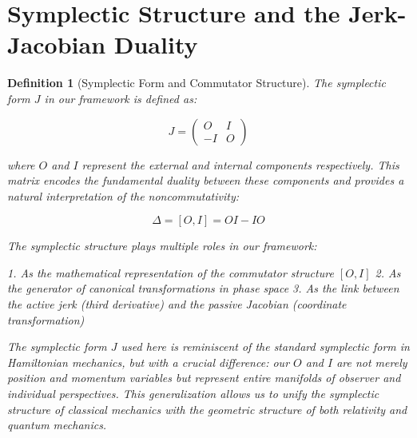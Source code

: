 \documentclass{article}
\newtheorem{definition}{Definition}
\begin{document}
\section{Symplectic Structure and the Jerk-Jacobian Duality}

\begin{definition}[Symplectic Form and Commutator Structure]
The symplectic form $J$ in our framework is defined as:

\begin{equation}
J = \begin{pmatrix} O & I \\ -I & O \end{pmatrix}
\end{equation}

where $O$ and $I$ represent the external and internal components respectively. This matrix encodes the fundamental duality between these components and provides a natural interpretation of the noncommutativity:

\begin{equation}
\Delta = [O, I] = OI - IO
\end{equation}

The symplectic structure plays multiple roles in our framework:

1. As the mathematical representation of the commutator structure $[O, I]$
2. As the generator of canonical transformations in phase space
3. As the link between the active jerk (third derivative) and the passive Jacobian (coordinate transformation)

The symplectic form $J$ used here is reminiscent of the standard symplectic form in Hamiltonian mechanics, but with a crucial difference: our $O$ and $I$ are not merely position and momentum variables but represent entire manifolds of observer and individual perspectives. This generalization allows us to unify the symplectic structure of classical mechanics with the geometric structure of both relativity and quantum mechanics.
\end{definition}
\end{document}
